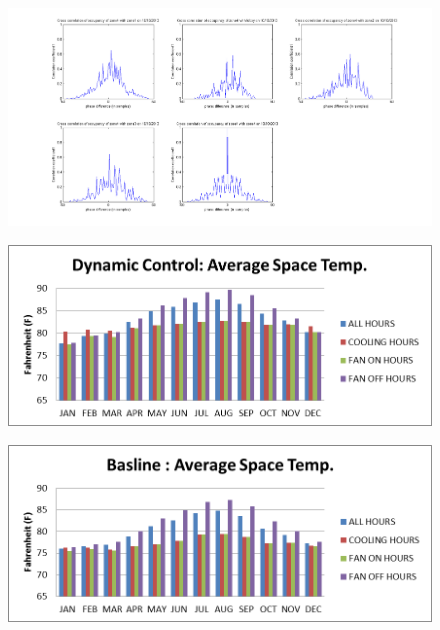 \begin{figure}[!ht]
  \centering
 	  	\includegraphics[width=1\columnwidth]{./images/crosscorrelation.png}
\end{figure}

\begin{figure}[!ht]
  \centering
 	  	\includegraphics[width=1\columnwidth]{./images/temp.png}
\end{figure}

\begin{figure}[!ht]
  \centering
 	  	\includegraphics[width=1\columnwidth]{./images/temp2.png}
\end{figure}